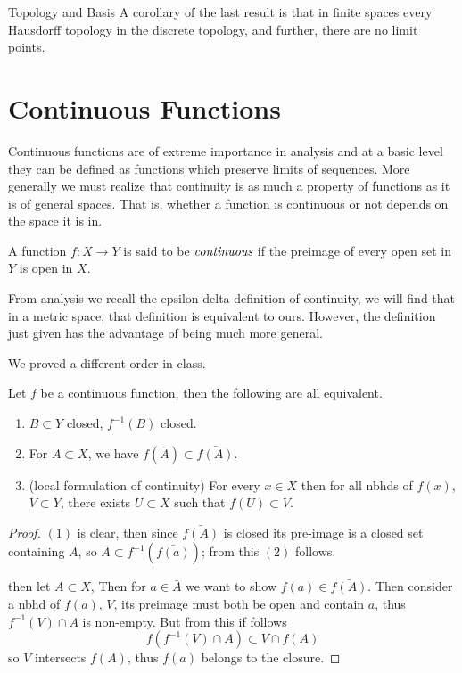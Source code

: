 \begin{chapter}{Topology and Basis}
   A corollary of the last result is that in finite spaces every Hausdorff topology in the discrete topology, and further, there are no limit points. 


   \section{Continuous Functions}

   Continuous functions are of extreme importance in analysis and at a basic level they can be defined as functions which preserve limits of sequences. More generally 
   we must realize that continuity is as much a property of functions as it is of general spaces. That is, whether a function is continuous or not depends on the space it 
   is in. 

   
   \begin{defn}
    A function $f: X \to Y$ is said to be $\emph{continuous}$ if the preimage of every open set in $Y$ is open in $X$. 
   \end{defn}


   From analysis we recall the epsilon delta definition of continuity, we will find that in a metric space, that definition is equivalent to ours. 
   However, the definition just given has the advantage of being much more general. 

   We proved a different order in class. 
   \begin{thm}
    Let $f$ be a continuous function, then the following are all equivalent. 
    \begin{enumerate}
        \item $B \subset Y$ closed, $f^{-1}(B)$ closed. 
        \item For $A \subset X$, we have $f(\bar{A}) \subset \bar{f(A)}$. 
        \item (local formulation of continuity) For every $x \in X$ then for all nbhds of $f(x)$, $V \subset Y$, there exists $U \subset X$ such that $f(U) \subset V$. 
    \end{enumerate}
   \end{thm}

   \begin{proof}
    $(1)$ is clear, then since $\bar{f(A)}$ is closed its pre-image is a closed set containing $A$, so $\bar{A} \subset f^{-1}(\bar{f(a)})$; from this 
    $(2)$ follows. 
    
    \medskip
    then let $A \subset X$, Then for $a \in \bar{A}$ we want to show $f(a) \in \bar{f(A)}$. Then consider a nbhd of $f(a)$, $V$, its preimage 
    must both be open and contain $a$, thus $f^{-1}(V) \cap A$ is non-empty. But from this if follows 
    \[f(f^{-1}(V) \cap A) \subset V \cap f(A)\]
    so $V$ intersects $f(A)$, thus $f(a)$ belongs to the closure. 
   \end{proof}



\end{chapter}
